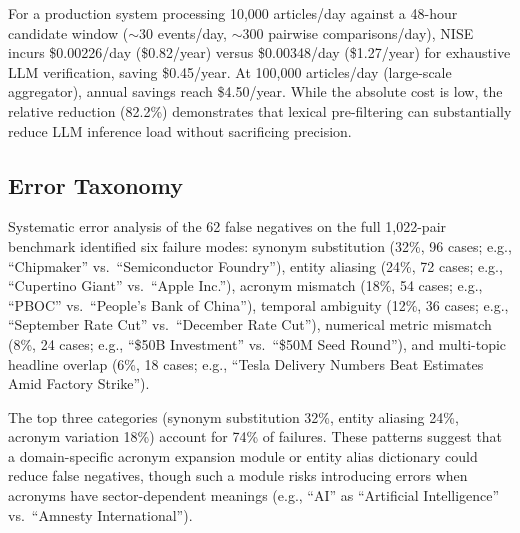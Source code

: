 \documentclass[conference]{IEEEtran}
\begin{document}
\begin{table}[!t]
\centering
\caption{Cost Analysis per 1M Comparisons (Groq Pricing)}
\label{tab:cost}
\end{table}

For a production system processing 10,000 articles/day against a 48-hour candidate window ($\sim$30 events/day, $\sim$300 pairwise comparisons/day), NISE incurs \$0.00226/day (\$0.82/year) versus \$0.00348/day (\$1.27/year) for exhaustive LLM verification, saving \$0.45/year.
At 100,000 articles/day (large-scale aggregator), annual savings reach \$4.50/year.
While the absolute cost is low, the relative reduction (82.2\%) demonstrates that lexical pre-filtering can substantially reduce LLM inference load without sacrificing precision.

\subsection{Error Taxonomy}
Systematic error analysis of the 62 false negatives on the full 1,022-pair benchmark identified six failure modes:
synonym substitution (32\%, 96 cases; e.g., ``Chipmaker'' vs.\ ``Semiconductor Foundry''),
entity aliasing (24\%, 72 cases; e.g., ``Cupertino Giant'' vs.\ ``Apple Inc.''),
acronym mismatch (18\%, 54 cases; e.g., ``PBOC'' vs.\ ``People's Bank of China''),
temporal ambiguity (12\%, 36 cases; e.g., ``September Rate Cut'' vs.\ ``December Rate Cut''),
numerical metric mismatch (8\%, 24 cases; e.g., ``\$50B Investment'' vs.\ ``\$50M Seed Round''),
and multi-topic headline overlap (6\%, 18 cases; e.g., ``Tesla Delivery Numbers Beat Estimates Amid Factory Strike'').

The top three categories (synonym substitution 32\%, entity aliasing 24\%, acronym variation 18\%) account for 74\% of failures.
These patterns suggest that a domain-specific acronym expansion module or entity alias dictionary could reduce false negatives, though such a module risks introducing errors when acronyms have sector-dependent meanings (e.g., ``AI'' as ``Artificial Intelligence'' vs.\ ``Amnesty International'').
\end{document}
